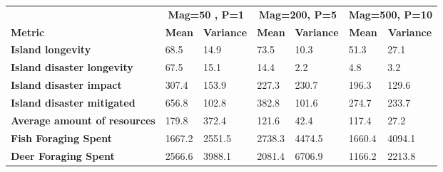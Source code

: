 \begin{table}[H]
\begin{tabular}{l|ll|ll|ll}
                                     & \multicolumn{2}{c}{\textbf{Mag=50 , P=1}}                             & \multicolumn{2}{c}{\textbf{Mag=200, P=5}}                                     & \multicolumn{2}{c}{\textbf{Mag=500, P=10}}                               \\
\textbf{Metric}                      & \multicolumn{1}{c}{\textbf{Mean}} & \multicolumn{1}{c}{\textbf{Variance}} & \multicolumn{1}{c}{\textbf{Mean}} & \multicolumn{1}{c}{\textbf{Variance}} & \multicolumn{1}{c}{\textbf{Mean}} & \multicolumn{1}{c}{\textbf{Variance}} \\ \hline
\textbf{Island longevity}            & 68.5                              & 14.9                                 & 73.5                              & 10.3                                 & 51.3                              & 27.1                                  \\
\textbf{Island disaster longevity}   & 67.5                              & 15.1                                 & 14.4                              & 2.2                                  & 4.8                               & 3.2                                   \\
\textbf{Island disaster impact}      & 307.4                             & 153.9                                & 227.3                             & 230.7                                & 196.3                             & 129.6                                 \\
\textbf{Island disaster mitigated}   & 656.8                             & 102.8                                & 382.8                             & 101.6                                & 274.7                             & 233.7                                 \\
\textbf{Average amount of resources} & 179.8                             & 372.4                                & 121.6                             & 42.4                                 & 117.4                             & 27.2                                  \\
\textbf{Fish Foraging Spent}         & 1667.2                            & 2551.5                               & 2738.3                            & 4474.5                               & 1660.4                            & 4094.1                                \\
\textbf{Deer Foraging Spent}         & 2566.6                            & 3988.1                               & 2081.4                            & 6706.9                               & 1166.2                            & 2213.8                                \\

\end{tabular}
\end{table}
